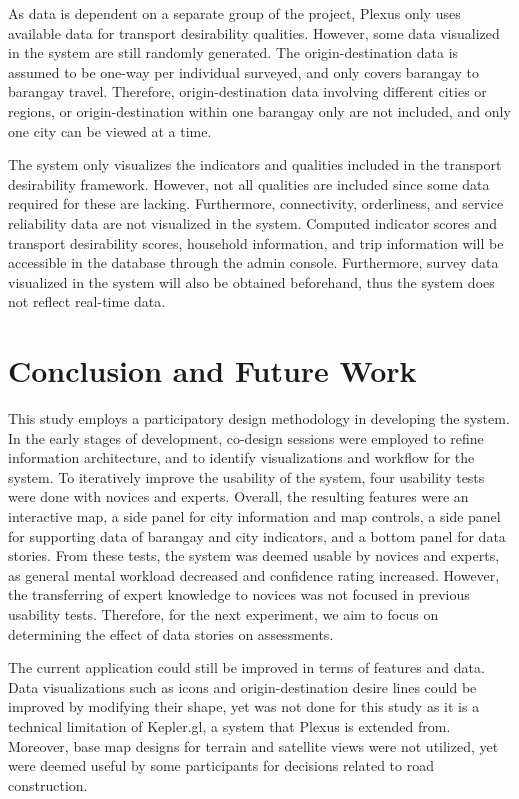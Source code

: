 \documentclass{sigchi}
\begin{document}
As data is dependent on a separate group of the project, Plexus only uses available data for transport desirability qualities. However, some data visualized in the system are still randomly generated. The origin-destination data is assumed to be one-way per individual surveyed, and only covers barangay to barangay travel. Therefore, origin-destination data involving different cities or regions, or origin-destination within one barangay only are not included, and only one city can be viewed at a time.

The system only visualizes the indicators and qualities included in the transport desirability framework. However, not all qualities are included since some data required for these are lacking. Furthermore, connectivity, orderliness, and service reliability data are not visualized in the system. Computed indicator scores and transport desirability scores, household information, and trip information will be accessible in the database through the admin console. Furthermore, survey data visualized in the system will also be obtained beforehand, thus the system does not reflect real-time data.

\section{Conclusion and Future Work}
This study employs a participatory design methodology in developing the system. In the early stages of development, co-design sessions were employed to refine information architecture, and to identify visualizations and workflow for the system. To iteratively improve the usability of the system, four usability tests were done with novices and experts. Overall, the resulting features were an interactive map, a side panel for city information and map controls, a side panel for supporting data of barangay and city indicators, and a bottom panel for data stories. From these tests, the system was deemed usable by novices and experts, as general mental workload decreased and confidence rating increased. However, the transferring of expert knowledge to novices was not focused in previous usability tests. Therefore, for the next experiment, we aim to focus on determining the effect of data stories on assessments.

The current application could still be improved in terms of features and data. Data visualizations such as icons and origin-destination desire lines could be improved by modifying their shape, yet was not done for this study as it is a technical limitation of Kepler.gl, a system that Plexus is extended from. Moreover, base map designs for terrain and satellite views were not utilized, yet were deemed useful by some participants for decisions related to road construction.
\end{document}
